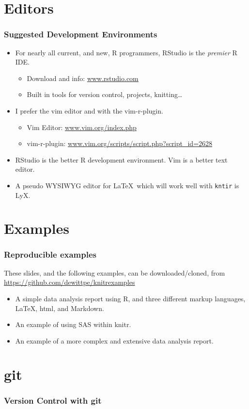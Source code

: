 \documentclass[t]{beamer}\usepackage[]{graphicx}\usepackage[]{color}
\begin{document}
\section{Editors} 
\begin{frame}
  \frametitle{Suggested Development Environments}

  \begin{itemize}
    \item For nearly all current, and new,  R programmers, 
      RStudio is the \emph{premier} R IDE.
      \begin{itemize}
        \item Download and info: \url{www.rstudio.com}

        \item Built in tools for version control, projects, knitting\ldots
      \end{itemize}

    \item I prefer the vim editor and with the vim-r-plugin.  
      \begin{itemize}
        \item Vim Editor: \url{www.vim.org/index.php}
        \item vim-r-plugin: \url{www.vim.org/scripts/script.php?script\_id=2628} 
      \end{itemize}

    \item RStudio is the better R development environment.  Vim is a better text
      editor.

    \item A pseudo WYSIWYG editor for \LaTeX\ which will work well with 
      {\tt kntir} is LyX.
      
  \end{itemize}
\end{frame}

\section{Examples}
\begin{frame}
  \frametitle{Reproducible examples}
  These slides, and the following examples, can be downloaded/cloned, from
  \url{https://github.com/dewittpe/knitrexamples}

  \begin{itemize}
    \item A simple data analysis report using R, and three different markup
      languages, \LaTeX, html, and Markdown.
    \item An example of using SAS within knitr.
    \item An example of a more complex and extensive data analysis report.
  \end{itemize}
\end{frame}

\section{git}
\begin{frame}[fragile]
  \frametitle{Version Control with git}
\end{frame}

\end{document}
